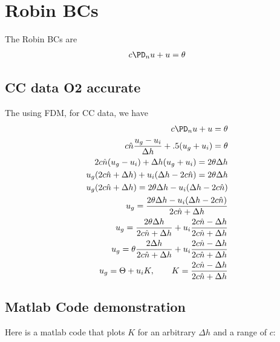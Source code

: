 \documentclass[11pt]{article}
\begin{document}
\doublespacing
\MOONSTITLE
\maketitle

\section{Robin BCs}
The Robin BCs are
\begin{equation}\begin{aligned}
  c \PD_n u + u = \theta \\
\end{aligned}\end{equation}
\subsection{CC data O2 accurate}
The using FDM, for CC data, we have
\begin{equation}\begin{aligned}
  c \PD_n u + u = \theta \\
  c \hat{n} \frac{u_g - u_i}{\Delta h} + .5 (u_g+u_i) = \theta \\
  2 c \hat{n} (u_g - u_i) + \Delta h (u_g+u_i) = 2 \theta \Delta h \\
  u_g (2 c \hat{n} + \Delta h) + u_i (\Delta h - 2c \hat{n}) = 2 \theta \Delta h \\
  u_g (2 c \hat{n} + \Delta h) = 2 \theta \Delta h - u_i (\Delta h - 2c \hat{n}) \\
  u_g = \frac{2 \theta \Delta h - u_i (\Delta h - 2c \hat{n})}{2 c \hat{n} + \Delta h} \\
  u_g = \frac{2 \theta \Delta h}{2 c \hat{n} + \Delta h} + u_i \frac{2c \hat{n} - \Delta h}{2 c \hat{n} + \Delta h} \\
  u_g = \theta \frac{2 \Delta h}{2 c \hat{n} + \Delta h} + u_i \frac{2c \hat{n} - \Delta h}{2 c \hat{n} + \Delta h} \\
  u_g = \Theta + u_i K, \qquad K = \frac{2c \hat{n} - \Delta h}{2 c \hat{n} + \Delta h} \\
\end{aligned}\end{equation}


\subsection{Matlab Code demonstration}
Here is a matlab code that plots $K$ for an arbitrary $\Delta h$ and a range of $c$:
\end{document}
